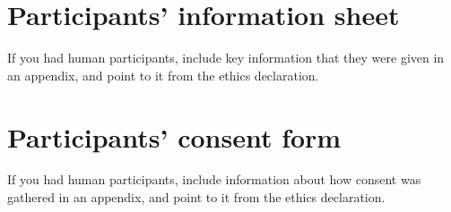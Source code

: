 \documentclass[logo,msc,cyber]{infthesis}   %
\begin{document}
\chapter{Participants' information sheet}

If you had human participants, include key information that they were given in
an appendix, and point to it from the ethics declaration.

\chapter{Participants' consent form}

If you had human participants, include information about how consent was
gathered in an appendix, and point to it from the ethics declaration.
\end{document}
